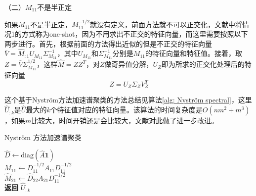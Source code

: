 （二）$M_{11}$不是半正定

如果$M_{11}$不是半正定，$M_{11}^{-1/2}$就没有定义，前面方法就不可以正交化，文献\cite{fowlkes2004spectral}中将情况1的方式称为one-shot，因为不用求出不正交的特征向量，而这里需要按照以下两步进行。首先，根据前面的方法得出近似的但是不正交的特征向量$\bar{V} = \hat{M}_{:1}U_{M_{11}}\Sigma_{M_{11}}^{-1}$，其中$U_{M_{11}}$和$\Sigma_{M_{11}}^{-1}$分别是$M_{11}$的特征向量和特征值。接着，取$Z = \bar{V}\Sigma_{M_{11}}^{1/2}$，这样$\hat{M} = ZZ^T$，对$Z$做奇异值分解，$U_Z$即为所求的正交化处理后的特征向量
\begin{equation*}
    Z = U_{Z}\Sigma_{Z}V_Z^T
\end{equation*}

这个基于Nyström方法加速谱聚类的方法总结见算法\ref{alg: Nyström spectral}，这里$\hat{U}_{:k}$是$\hat{U}$最大的$k$个特征值对应的特征向量。该算法的时间复杂度是$O(nm^2+m^3)$，如果$m$比较大，时间开销还是会比较大，文献\cite{li2011time,choromanska2013fast}对此做了进一步改进。
\begin{algorithm}[h]
    \caption{Nyström 方法加速谱聚类}\label{alg: Nyström spectral}
    $\hat{D} \gets \text{diag}(\hat{A}\mathbf{1})$\\
    $M_{11} \gets D_{11}^{-1/2}A_{11}D_{11}^{-1/2}$ \\
    $\hat{M}_{21} \gets \hat{D}_{22}A_{21}D_{11}^{-1/2}$ \\
    \textbf{返回} $\hat{U}_{:k}$
\end{algorithm}

